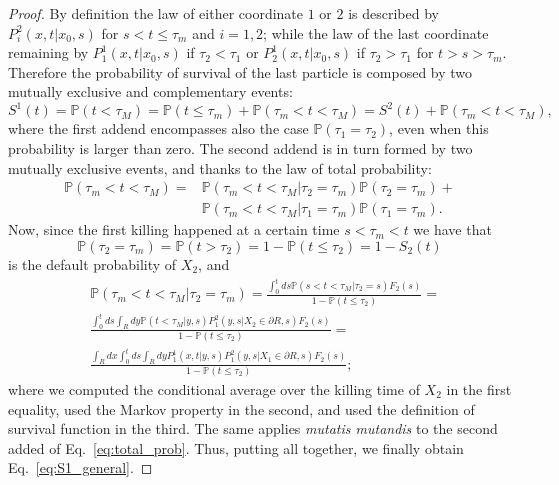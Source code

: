 \documentclass[a4paper,11pt]{amsart}
\theoremstyle{remark}
\begin{document}
  \begin{proof}
    By definition the law of either coordinate $1$ or $2$ is described by $P^2_i(x,t|x_0,s)$ for $s<t\leq\tau_m$ and $i=1,2$; while the law of the last coordinate remaining by $P^1_1(x,t|x_0,s)$ if $\tau_2<\tau_1$ or $P^1_2(x,t|x_0,s)$ if $\tau_2>\tau_1$ for $t>s>\tau_m$. Therefore the probability of survival of the last particle is composed by two mutually exclusive and complementary events:
    \begin{equation}
      S^1(t)=\mathbb{P}(t<\tau_M)=\mathbb{P}(t\leq\tau_m)+\mathbb{P}(\tau_m<t<\tau_M)=S^2(t)+\mathbb{P}(\tau_m<t<\tau_M),
    \end{equation}
    where the first addend encompasses also the case $\mathbb{P}(\tau_1=\tau_2)$, even when this probability is larger than zero. The second addend is in turn formed by two mutually exclusive events, and thanks to the law of total probability:
    \begin{equation}
      \label{eq:total_prob}
      \begin{aligned}
        \mathbb{P}(\tau_m<t<\tau_M)=&\mathbb{P}(\tau_m<t<\tau_M|\tau_2=\tau_m)\mathbb{P}(\tau_2=\tau_m)+\\
        &\mathbb{P}(\tau_m<t<\tau_M|\tau_1=\tau_m)\mathbb{P}(\tau_1=\tau_m).
      \end{aligned}
    \end{equation}
    Now, since the first killing happened at a certain time $s<\tau_m<t$ we have that
    \begin{equation}
      \mathbb{P}(\tau_2=\tau_m)=\mathbb{P}(t>\tau_2)=1-\mathbb{P}(t\leq\tau_2)=1-S_2(t)
    \end{equation}
    is the default probability of $X_2$, and
    \begin{equation}
      \begin{aligned}
        &\mathbb{P}(\tau_m<t<\tau_M|\tau_2=\tau_m)=\frac{\int_0^tds \mathbb{P}(s<t<\tau_M|\tau_2=s)F_{2}(s)}{1-\mathbb{P}(t\leq\tau_2)}=\\
        &\frac{\int_0^tds \int_Rdy \mathbb{P}(t<\tau_M|y,s)P^2_1(y,s|X_2 \in \partial R,s)F_{2}(s)}{1-\mathbb{P}(t\leq\tau_2)}=\\
        &\frac{\int_Rdx\int_0^tds \int_Rdy P^1_1(x,t|y,s)P^2_1(y,s|X_1 \in \partial R,s)F_{2}(s)}{1-\mathbb{P}(t\leq\tau_2)};
      \end{aligned}
    \end{equation}
    where we computed the conditional average over the killing time of $X_2$ in the first equality, used the Markov property in the second, and used the definition of survival function in the third. The same applies\emph{ mutatis mutandis} to the second added of Eq.~\eqref{eq:total_prob}. Thus, putting all together, we finally obtain Eq.~\eqref{eq:S1_general}.
  \end{proof}
\end{document}
